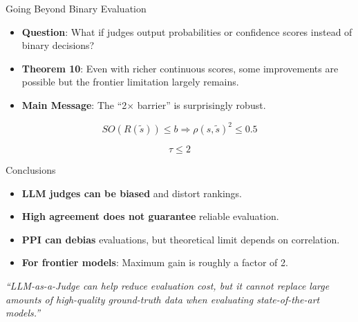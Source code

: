 \documentclass[10pt]{beamer}
\begin{document}
\begin{frame}{Going Beyond Binary Evaluation}
  \begin{itemize}
    \item \textbf{Question}: What if judges output probabilities or confidence scores instead of binary decisions?
    \item \textbf{Theorem 10}: Even with richer continuous scores, some improvements are possible but the frontier limitation largely remains.
    \item \textbf{Main Message}: The ``2$\times$ barrier'' is surprisingly robust.
  \end{itemize}
  
  \vspace{0.4em}
  \[
    SO(R(\tilde{s})) \le b \Rightarrow \rho(s,\tilde{s})^2 \le 0.5
  \]

  \[
    \tau \le 2
  \]
\end{frame}

\begin{frame}{Conclusions}
  \begin{itemize}
    \item \textbf{LLM judges can be biased} and distort rankings.
    \item \textbf{High agreement does not guarantee} reliable evaluation.
    \item \textbf{PPI can debias} evaluations, but theoretical limit depends on correlation.
    \item \textbf{For frontier models}: Maximum gain is roughly a factor of 2.
  \end{itemize}
  \vspace{0.5em}
  \begin{block}{\centering}
    \textit{``LLM-as-a-Judge can help reduce evaluation cost, but it cannot replace large amounts of high-quality ground-truth data when evaluating state-of-the-art models.''}
  \end{block}
\end{frame}
\end{document}
